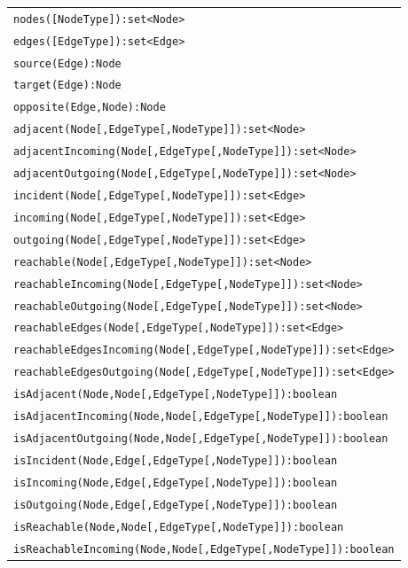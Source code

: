 \begin{table}[htbp]
\centering
\begin{tabular}{|l|}
\hline
\texttt{nodes([NodeType]):set<Node>}\\
\texttt{edges([EdgeType]):set<Edge>}\\
\hline
\texttt{source(Edge):Node}\\
\texttt{target(Edge):Node}\\
\texttt{opposite(Edge,Node):Node}\\
\hline
\texttt{adjacent(Node[,EdgeType[,NodeType]]):set<Node>}\\
\texttt{adjacentIncoming(Node[,EdgeType[,NodeType]]):set<Node>}\\
\texttt{adjacentOutgoing(Node[,EdgeType[,NodeType]]):set<Node>}\\
\texttt{incident(Node[,EdgeType[,NodeType]]):set<Edge>}\\
\texttt{incoming(Node[,EdgeType[,NodeType]]):set<Edge>}\\
\texttt{outgoing(Node[,EdgeType[,NodeType]]):set<Edge>}\\
\hline
\texttt{reachable(Node[,EdgeType[,NodeType]]):set<Node>}\\
\texttt{reachableIncoming(Node[,EdgeType[,NodeType]]):set<Node>}\\
\texttt{reachableOutgoing(Node[,EdgeType[,NodeType]]):set<Node>}\\
\texttt{reachableEdges(Node[,EdgeType[,NodeType]]):set<Edge>}\\
\texttt{reachableEdgesIncoming(Node[,EdgeType[,NodeType]]):set<Edge>}\\
\texttt{reachableEdgesOutgoing(Node[,EdgeType[,NodeType]]):set<Edge>}\\
\hline
\texttt{isAdjacent(Node,Node[,EdgeType[,NodeType]]):boolean}\\
\texttt{isAdjacentIncoming(Node,Node[,EdgeType[,NodeType]]):boolean}\\
\texttt{isAdjacentOutgoing(Node,Node[,EdgeType[,NodeType]]):boolean}\\
\texttt{isIncident(Node,Edge[,EdgeType[,NodeType]]):boolean}\\
\texttt{isIncoming(Node,Edge[,EdgeType[,NodeType]]):boolean}\\
\texttt{isOutgoing(Node,Edge[,EdgeType[,NodeType]]):boolean}\\
\hline
\texttt{isReachable(Node,Node[,EdgeType[,NodeType]]):boolean}\\
\texttt{isReachableIncoming(Node,Node[,EdgeType[,NodeType]]):boolean}\\

\end{tabular}
\end{table}
